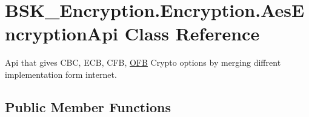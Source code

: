 \hypertarget{class_b_s_k___encryption_1_1_encryption_1_1_aes_encryption_api}{}\section{B\+S\+K\+\_\+\+Encryption.\+Encryption.\+Aes\+Encryption\+Api Class Reference}
\label{class_b_s_k___encryption_1_1_encryption_1_1_aes_encryption_api}


Api that gives C\+BC, E\+CB, C\+FB, \mbox{\hyperlink{namespace_b_s_k___encryption_1_1_encryption_1_1_o_f_b}{O\+FB}} Crypto options by merging diffrent implementation form internet.  


\subsection*{Public Member Functions}
